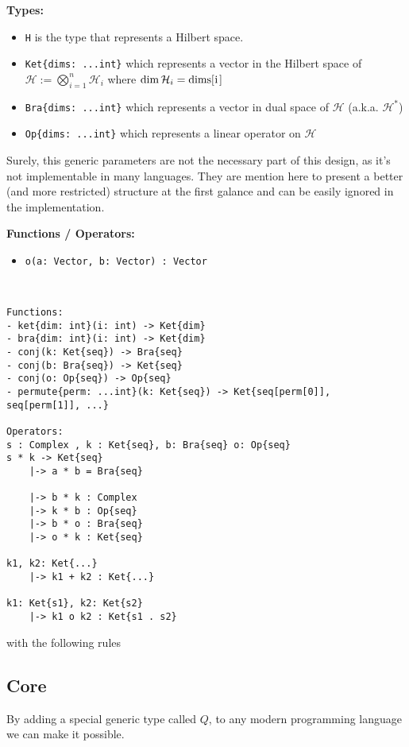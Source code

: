 \documentclass[a4paper,11pt]{article}
\def\co{\lstinline}
\begin{document}
\textbf{Types: }
\begin{itemize}
    \item \co|H| is the type that represents a Hilbert space. 
	\item \co|Ket{dims: ...int}| which represents a vector in the Hilbert space of $\mathcal{H} := \bigotimes_{i = 1}^n \mathcal{H}_i$ where $\dim \mathcal{H}_i = \text{\co|dims[i]|}$
    \item \co|Bra{dims: ...int}| which represents a vector in dual space of $\mathcal{H}$ (a.k.a. $\mathcal{H}^*$)
    \item \co|Op{dims: ...int}| which represents a linear operator on $\mathcal{H}$
\end{itemize}

Surely, this generic parameters are not the necessary part of this design, as it's not implementable in many languages. They are mention here to present a better (and more restricted) structure at the first galance and can be easily ignored in the implementation.

\textbf{Functions / Operators: }

\begin{itemize}
	\item \co|o(a: Vector, b: Vector) : Vector|
\end{itemize}
\begin{lstlisting}


Functions:
- ket{dim: int}(i: int) -> Ket{dim}
- bra{dim: int}(i: int) -> Ket{dim}
- conj(k: Ket{seq}) -> Bra{seq}
- conj(b: Bra{seq}) -> Ket{seq}
- conj(o: Op{seq}) -> Op{seq}
- permute{perm: ...int}(k: Ket{seq}) -> Ket{seq[perm[0]], seq[perm[1]], ...}

Operators:
s : Complex , k : Ket{seq}, b: Bra{seq} o: Op{seq}
s * k -> Ket{seq}
    |-> a * b = Bra{seq}

    |-> b * k : Complex
    |-> k * b : Op{seq}
    |-> b * o : Bra{seq}
    |-> o * k : Ket{seq}
    
k1, k2: Ket{...}
    |-> k1 + k2 : Ket{...}

k1: Ket{s1}, k2: Ket{s2}
    |-> k1 o k2 : Ket{s1 . s2}
\end{lstlisting}
with the following rules

\subsection{Core}

By adding a special generic type called $Q$, to any modern programming language we can make it possible.
\end{document}
